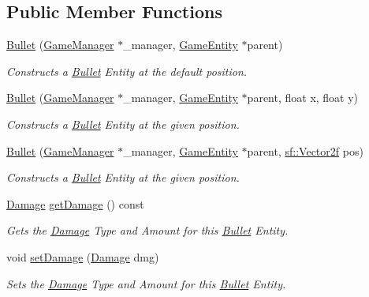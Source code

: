 \subsection*{Public Member Functions}
\begin{DoxyCompactItemize}
\item 
\mbox{\hyperlink{class_bullet_a8f9c05192908b186a3c01a74a58cb15c}{Bullet}} (\mbox{\hyperlink{class_game_manager}{Game\+Manager}} $\ast$\+\_\+manager, \mbox{\hyperlink{class_game_entity}{Game\+Entity}} $\ast$parent)
\begin{DoxyCompactList}\small\item\em Constructs a \mbox{\hyperlink{class_bullet}{Bullet}} Entity at the default position. \end{DoxyCompactList}\item 
\mbox{\hyperlink{class_bullet_a0b4ea3318d4f91f8d74515e486765e19}{Bullet}} (\mbox{\hyperlink{class_game_manager}{Game\+Manager}} $\ast$\+\_\+manager, \mbox{\hyperlink{class_game_entity}{Game\+Entity}} $\ast$parent, float x, float y)
\begin{DoxyCompactList}\small\item\em Constructs a \mbox{\hyperlink{class_bullet}{Bullet}} Entity at the given position. \end{DoxyCompactList}\item 
\mbox{\hyperlink{class_bullet_af56940d89d68f8b552611695e4107c80}{Bullet}} (\mbox{\hyperlink{class_game_manager}{Game\+Manager}} $\ast$\+\_\+manager, \mbox{\hyperlink{class_game_entity}{Game\+Entity}} $\ast$parent, \mbox{\hyperlink{classsf_1_1_vector2}{sf\+::\+Vector2f}} pos)
\begin{DoxyCompactList}\small\item\em Constructs a \mbox{\hyperlink{class_bullet}{Bullet}} Entity at the given position. \end{DoxyCompactList}\item 
\mbox{\hyperlink{struct_damage}{Damage}} \mbox{\hyperlink{class_bullet_a4840cd10b4da464618f2b4b256a6f744}{get\+Damage}} () const
\begin{DoxyCompactList}\small\item\em Gets the \mbox{\hyperlink{struct_damage}{Damage}} Type and Amount for this \mbox{\hyperlink{class_bullet}{Bullet}} Entity. \end{DoxyCompactList}\item 
void \mbox{\hyperlink{class_bullet_abda4abdf149369188eb7cf7768ef2e56}{set\+Damage}} (\mbox{\hyperlink{struct_damage}{Damage}} dmg)
\begin{DoxyCompactList}\small\item\em Sets the \mbox{\hyperlink{struct_damage}{Damage}} Type and Amount for this \mbox{\hyperlink{class_bullet}{Bullet}} Entity. \end{DoxyCompactList}\item 

\end{DoxyCompactItemize}
